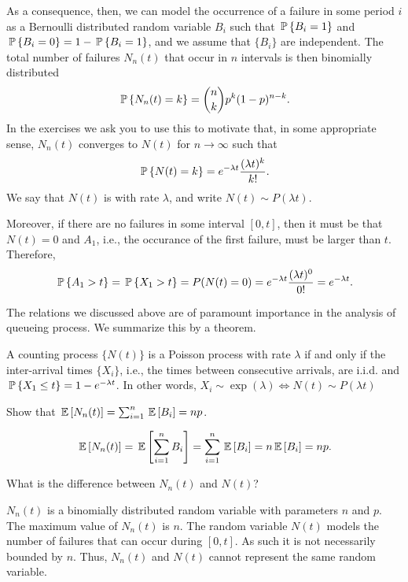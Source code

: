 As a consequence, then, we can model the occurrence of a failure in
some period $i$ as a Bernoulli distributed random variable $B_i$ such
that $\P{B_i =1}$ and $\P{B_i=0} = 1-\P{B_i = 1}$, and we assume that
$\{B_i\}$ are independent. The total number of failures $N_n(t)$ that
occur in $n$ intervals is then binomially distributed
\begin{equation}\label{eq:bin}
  \P{N_n(t) = k} = {n \choose k} p^k (1-p)^{n-k}.
\end{equation}
In the exercises we ask you to use this to motivate that, in some
appropriate sense, $N_n(t)$ converges to $N(t)$ for $n\to \infty$ such
that
\begin{equation}\label{eq:pois}
  \P{N(t) = k} = 
e^{-\lambda t} \frac{(\lambda t)^k}{k!}.
\end{equation}
We say that $N(t)$ is  with rate
$\lambda$, and write $N(t)\sim P(\lambda t)$. 

Moreover, if there are no failures in some interval
$[0,t]$, then it must be that $N(t) = 0$ and $A_1$, i.e., the
occurance of the first failure, must be larger than $t$.  Therefore,
\begin{equation*}
  \P{A_1>t} = \P{X_1> t} = P(N(t) = 0) = e^{-\lambda t} \frac{(\lambda t)^0}{0!}= e^{-\lambda t}.
\end{equation*}

The relations we discussed above are of paramount importance in the
analysis of queueing process. We summarize this by a theorem.
\begin{theorem}\label{thr:1}
  A counting process $\{N(t)\}$ is a Poisson process with rate $\lambda$ if and only if
  the inter-arrival times $\{X_i\}$, i.e., the times between consecutive
  arrivals, are i.i.d. and $\P{ X_1\leq t} = 1 - e^{-\lambda t}$. In other words, $X_i\sim \exp(\lambda) \Leftrightarrow N(t) \sim P(\lambda t)$ 
\end{theorem}

\begin{question}
Show that $\E{N_n(t)} = \sum_{i=1}^n \E{B_i} = n p$.
\begin{solution}
  \begin{equation*}
    \E{N_n(t)} = \E{\sum_{i=1}^n {B_i}} = \sum_{i=1}^n \E{B_i} = n \E{B_i} = n p.
  \end{equation*}
\end{solution}
\end{question}


\begin{question}
What is the difference between $N_n(t)$ and $N(t)$?
\begin{solution}
  $N_n(t)$ is a binomially distributed random variable with parameters
  $n$ and $p$. The maximum value of $N_n(t)$ is $n$. The random
  variable $N(t)$ models the number of failures that can occur during
  $[0,t]$. As such it is not necessarily bounded by $n$. Thus, $N_n(t)$ and $N(t)$ cannot represent the same random variable. 
\end{solution}
\end{question}

